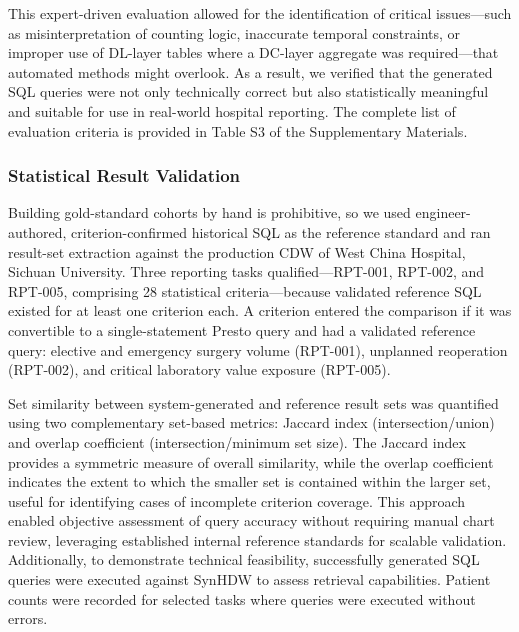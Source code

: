 \documentclass[applsci,article,submit,pdftex,oneauthor]{Definitions/mdpi}
\begin{document}
This expert-driven evaluation allowed for the identification of critical
issues---such as misinterpretation of counting logic, inaccurate temporal
constraints, or improper use of DL-layer tables where a DC-layer aggregate was
required---that automated methods might overlook. As a result, we verified that
the generated SQL queries were not only technically correct but also
statistically meaningful and suitable for use in real-world hospital reporting.
The complete list of evaluation criteria is provided in Table S3 of the
Supplementary Materials.

\subsubsection{Statistical Result Validation}
Building gold-standard cohorts by hand is prohibitive, so we used engineer-authored, criterion-confirmed historical SQL as the reference standard and ran result-set extraction against the production CDW of West China Hospital, Sichuan University. Three reporting tasks qualified---RPT-001, RPT-002, and RPT-005, comprising 28 statistical criteria---because validated reference SQL existed for at least one criterion each. A criterion entered the comparison if it was convertible to a single-statement Presto query and had a validated reference query: elective and emergency surgery volume (RPT-001), unplanned reoperation (RPT-002), and critical laboratory value exposure (RPT-005).

Set similarity between system-generated and reference result sets was quantified
using two complementary set-based metrics: Jaccard index (intersection/union)
and overlap coefficient (intersection/minimum set size). The Jaccard index
provides a symmetric measure of overall similarity, while the overlap
coefficient indicates the extent to which the smaller set is contained within
the larger set, useful for identifying cases of incomplete criterion coverage.
This approach enabled objective assessment of query accuracy without requiring
manual chart review, leveraging established internal reference standards for
scalable validation. Additionally, to demonstrate technical feasibility,
successfully generated SQL queries were executed against SynHDW to assess
retrieval capabilities. Patient counts were recorded for selected tasks where
queries were executed without errors.
\end{document}
